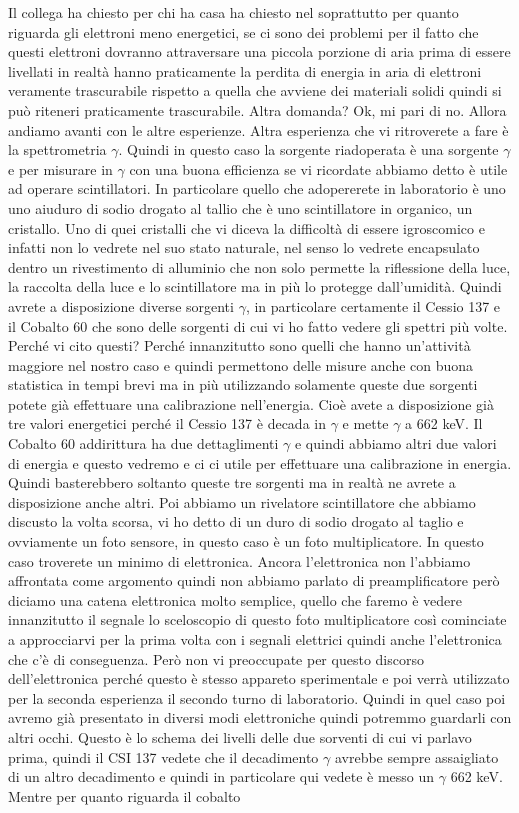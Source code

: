 {Il collega ha chiesto per chi ha casa ha chiesto nel soprattutto per quanto riguarda gli elettroni meno energetici, se ci sono dei problemi per il fatto che questi elettroni dovranno attraversare una piccola porzione di aria prima di essere livellati in realtà hanno praticamente la perdita di energia in aria di elettroni veramente trascurabile rispetto a quella che avviene dei materiali solidi quindi si può riteneri praticamente trascurabile. Altra domanda? Ok, mi pari di no. Allora andiamo avanti con le altre esperienze. Altra esperienza che vi ritroverete a fare è la spettrometria $\gamma$. Quindi in questo caso la sorgente riadoperata è una sorgente $\gamma$ e per misurare in $\gamma$ con una buona efficienza se vi ricordate abbiamo detto è utile ad operare scintillatori. In particolare quello che adopererete in laboratorio è uno uno aiuduro di sodio drogato al tallio che è uno scintillatore in organico, un cristallo. Uno di quei cristalli che vi diceva la difficoltà di essere igroscomico e infatti non lo vedrete nel suo stato naturale, nel senso lo vedrete encapsulato dentro un rivestimento di alluminio che non solo permette la riflessione della luce, la raccolta della luce e lo scintillatore ma in più lo protegge dall'umidità. Quindi avrete a disposizione diverse sorgenti $\gamma$, in particolare certamente il Cessio 137 e il Cobalto 60 che sono delle sorgenti di cui vi ho fatto vedere gli spettri più volte. Perché vi cito questi? Perché innanzitutto sono quelli che hanno un'attività maggiore nel nostro caso e quindi permettono delle misure anche con buona statistica in tempi brevi ma in più utilizzando solamente queste due sorgenti potete già effettuare una calibrazione nell'energia. Cioè avete a disposizione già tre valori energetici perché il Cessio 137 è decada in $\gamma$ e mette $\gamma$ a 662 keV. Il Cobalto 60 addirittura ha due dettaglimenti $\gamma$ e quindi abbiamo altri due valori di energia e questo vedremo e ci ci utile per effettuare una calibrazione in energia. Quindi basterebbero soltanto queste tre sorgenti ma in realtà ne avrete a disposizione anche altri. Poi abbiamo un rivelatore scintillatore che abbiamo discusto la volta scorsa, vi ho detto di un duro di sodio drogato al taglio e ovviamente un foto sensore, in questo caso è un foto multiplicatore. In questo caso troverete un minimo di elettronica. Ancora l'elettronica non l'abbiamo affrontata come argomento quindi non abbiamo parlato di preamplificatore però diciamo una catena elettronica molto semplice, quello che faremo è vedere innanzitutto il segnale lo sceloscopio di questo foto multiplicatore così cominciate a approcciarvi per la prima volta con i segnali elettrici quindi anche l'elettronica che c'è di conseguenza. Però non vi preoccupate per questo discorso dell'elettronica perché questo è stesso appareto sperimentale e poi verrà utilizzato per la seconda esperienza il secondo turno di laboratorio. Quindi in quel caso poi avremo già presentato in diversi modi elettroniche quindi potremmo guardarli con altri occhi. Questo è lo schema dei livelli delle due sorventi di cui vi parlavo prima, quindi il CSI 137 vedete che il decadimento $\gamma$ avrebbe sempre assaigliato di un altro decadimento e quindi in particolare qui vedete è messo un $\gamma$ 662 keV. Mentre per quanto riguarda il cobalto }
